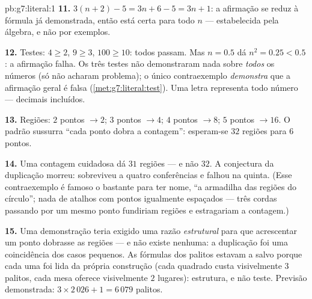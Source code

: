 \begin{solution}{pb:g7:literal:1}
\textbf{11.} $3(n + 2) - 5 = 3n + 6 - 5 = 3n + 1$: a afirmação se
reduz à fórmula já demonstrada, então está certa para todo $n$ ---
estabelecida pela álgebra, e não por exemplos.

\textbf{12.} Testes: $4 \geq 2$, $9 \geq 3$, $100 \geq 10$: todos
passam. Mas $n = 0.5$ dá $n^2 = 0.25 < 0.5$: a afirmação falha. Os três
testes não demonstraram nada sobre \emph{todos} os números (só não
acharam problema); o único contraexemplo \emph{demonstra} que a
afirmação geral é falsa (\cref{met:g7:literal:test}). Uma letra
representa todo número --- decimais incluídos.

\textbf{13.} Regiões: $2$ pontos $\to 2$; $3$ pontos $\to 4$; $4$
pontos $\to 8$; $5$ pontos $\to 16$. O padrão sussurra ``cada ponto
dobra a contagem'': esperam-se $32$ regiões para $6$ pontos.

\textbf{14.} Uma contagem cuidadosa dá $31$ regiões --- e não $32$. A
conjectura da duplicação morreu: sobreviveu a quatro conferências e
falhou na quinta. (Esse contraexemplo é famoso o bastante para ter
nome, ``a armadilha das regiões do círculo''; nada de atalhos com
pontos igualmente espaçados --- três cordas passando por um mesmo ponto
fundiriam regiões e estragariam a contagem.)

\textbf{15.} Uma demonstração teria exigido uma razão
\emph{estrutural} para que acrescentar um ponto dobrasse as regiões ---
e não existe nenhuma: a duplicação foi uma coincidência dos casos
pequenos. As fórmulas dos palitos estavam a salvo porque cada uma foi
lida da própria construção (cada quadrado custa visivelmente $3$
palitos, cada mesa oferece visivelmente $2$ lugares): estrutura, e não
teste. Previsão demonstrada: $3 \times 2\,026 + 1 = 6\,079$ palitos.
\end{solution}
